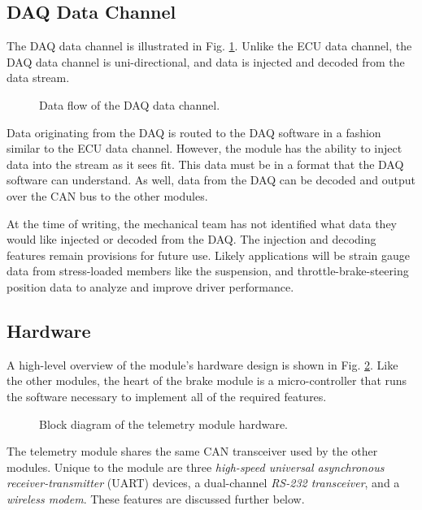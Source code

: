 \subsection{DAQ Data Channel}

The DAQ data channel is illustrated in Fig. \ref{fig:dac_data_channel}. Unlike the ECU data channel, the DAQ data channel is uni-directional, and data is injected and decoded from the data stream.

\begin{figure}[H]
	\centering
	
	\caption{Data flow of the DAQ data channel.}
	\label{fig:dac_data_channel}
\end{figure}

Data originating from the DAQ is routed to the DAQ software in a fashion similar to the ECU data channel. However, the module has the ability to inject data into the stream as it sees fit. This data must be in a format that the DAQ software can understand. As well, data from the DAQ can be decoded and output over the CAN bus to the other modules. 

At the time of writing, the mechanical team has not identified what data they would like injected or decoded from the DAQ. The injection and decoding features remain provisions for future use. Likely applications will be strain gauge data from stress-loaded members like the suspension, and throttle-brake-steering position data to analyze and improve driver performance.

\subsection{Hardware}

A high-level overview of the module's hardware design is shown in Fig. \ref{fig:design_telemetry_hardware_block}. Like the other modules, the heart of the brake module is a micro-controller that runs the software necessary to implement all of the required features. 

\begin{figure}[H]
\centering

\caption{Block diagram of the telemetry module hardware.}
\label{fig:design_telemetry_hardware_block}
\end{figure}


The telemetry module shares the same CAN transceiver used by the other modules. Unique to the module are three \emph{high-speed universal asynchronous receiver-transmitter} (UART) devices, a dual-channel \emph{RS-232 transceiver}, and a \emph{wireless modem}. These features are discussed further below.

